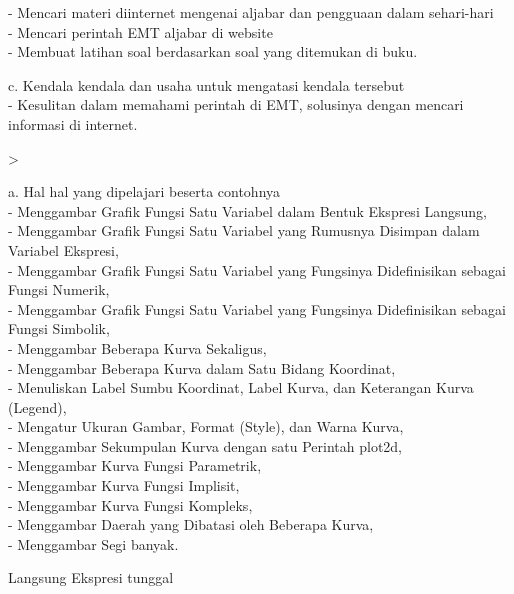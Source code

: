 \documentclass[a4paper,10pt]{article}
\begin{document}
\begin{eulernotebook}
\begin{eulercomment}
\begin{eulercomment}
\begin{eulercomment}
\begin{eulercomment}
\begin{eulercomment}
\begin{eulercomment}
\begin{eulercomment}
- Mencari materi diinternet mengenai aljabar dan pengguaan dalam
sehari-hari\\
- Mencari perintah EMT aljabar di website\\
- Membuat latihan soal berdasarkan soal yang ditemukan di buku.

c. Kendala kendala dan usaha untuk mengatasi kendala tersebut\\
- Kesulitan dalam memahami perintah di EMT, solusinya dengan mencari
informasi di internet.\\
\end{eulercomment}
\eulersubheading{}
\begin{eulerprompt}
> 
\end{eulerprompt}
\begin{eulercomment}
a. Hal hal yang dipelajari beserta contohnya\\
- Menggambar Grafik Fungsi Satu Variabel dalam Bentuk Ekspresi
Langsung,\\
- Menggambar Grafik Fungsi Satu Variabel yang Rumusnya Disimpan dalam
Variabel Ekspresi,\\
- Menggambar Grafik Fungsi Satu Variabel yang Fungsinya Didefinisikan
sebagai Fungsi Numerik,\\
- Menggambar Grafik Fungsi Satu Variabel yang Fungsinya Didefinisikan
sebagai Fungsi Simbolik,\\
- Menggambar Beberapa Kurva Sekaligus,\\
- Menggambar Beberapa Kurva dalam Satu Bidang Koordinat,\\
- Menuliskan Label Sumbu Koordinat, Label Kurva, dan Keterangan Kurva
(Legend),\\
- Mengatur Ukuran Gambar, Format (Style), dan Warna Kurva,\\
- Menggambar Sekumpulan Kurva dengan satu Perintah plot2d,\\
- Menggambar Kurva Fungsi Parametrik,\\
- Menggambar Kurva Fungsi Implisit,\\
- Menggambar Kurva Fungsi Kompleks,\\
- Menggambar Daerah yang Dibatasi oleh Beberapa Kurva,\\
- Menggambar Segi banyak.


\end{eulercomment}
\begin{eulercomment}
Langsung Ekspresi tunggal


\end{eulercomment}
\end{eulercomment}
\end{eulercomment}
\end{eulercomment}
\end{eulercomment}
\end{eulercomment}
\end{eulercomment}
\end{eulernotebook}
\end{document}

